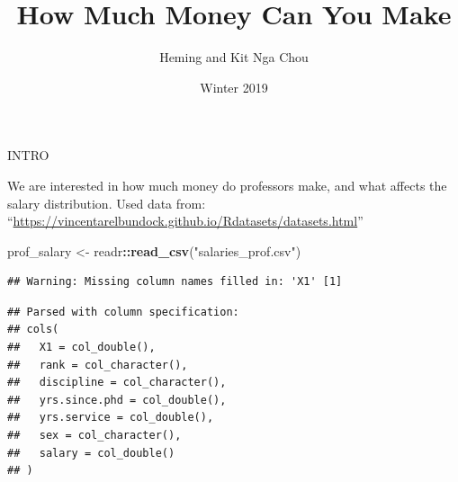 \documentclass[ignorenonframetext,]{beamer}
\title{How Much Money Can You Make}
\author{Heming and Kit Nga Chou}
\date{Winter 2019}
\newenvironment{Shaded}{\begin{snugshade}}{\end{snugshade}}
\newcommand{\KeywordTok}[1]{\textcolor[rgb]{0.13,0.29,0.53}{\textbf{#1}}}
\newcommand{\StringTok}[1]{\textcolor[rgb]{0.31,0.60,0.02}{#1}}
\newcommand{\OperatorTok}[1]{\textcolor[rgb]{0.81,0.36,0.00}{\textbf{#1}}}
\newcommand{\NormalTok}[1]{#1}
\begin{document}
\frame{\titlepage}

\begin{frame}[fragile]

\begin{block}{INTRO}

We are interested in how much money do professors make, and what affects
the salary distribution. Used data from:
``\url{https://vincentarelbundock.github.io/Rdatasets/datasets.html}''

\begin{Shaded}
\begin{Highlighting}[]
\NormalTok{prof_salary <-}
\StringTok{  }\NormalTok{readr}\OperatorTok{::}\KeywordTok{read_csv}\NormalTok{(}\StringTok{"salaries_prof.csv"}\NormalTok{)}
\end{Highlighting}
\end{Shaded}

\begin{verbatim}
## Warning: Missing column names filled in: 'X1' [1]
\end{verbatim}

\begin{verbatim}
## Parsed with column specification:
## cols(
##   X1 = col_double(),
##   rank = col_character(),
##   discipline = col_character(),
##   yrs.since.phd = col_double(),
##   yrs.service = col_double(),
##   sex = col_character(),
##   salary = col_double()
## )
\end{verbatim}

\end{block}

\end{frame}
\end{document}
